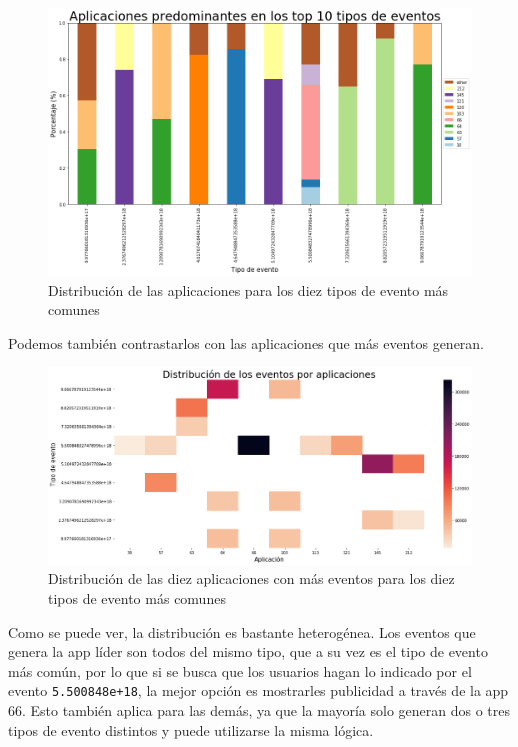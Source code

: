 \documentclass[a4paper, 12pt]{article}
\begin{document}
		\FloatBarrier
		\begin{figure}[h]
			\centering
			\includegraphics[width=\textwidth]{images/events/appsxev.png}
			\caption{Distribución de las aplicaciones para los diez tipos de evento más comunes}
		\end{figure}
		\FloatBarrier
		
		Podemos también contrastarlos con las aplicaciones que más eventos generan.
		
		\FloatBarrier
		\begin{figure}[h]
			\centering
			\includegraphics[width=\textwidth]{images/events/top10appsevents.png}
			\caption{Distribución de las diez aplicaciones con más eventos para los diez tipos de evento más comunes}
		\end{figure}
		\FloatBarrier
		
		Como se puede ver, la distribución es bastante heterogénea. Los eventos que genera la app líder son todos del mismo tipo, que a su vez es el tipo de evento más común, por lo que si se busca que los usuarios hagan lo indicado por el evento \texttt{5.500848e+18}, la mejor opción es mostrarles publicidad a través de la app 66. Esto también aplica para las demás, ya que la mayoría solo generan dos o tres tipos de evento distintos y puede utilizarse la misma lógica.
		
\end{document}
